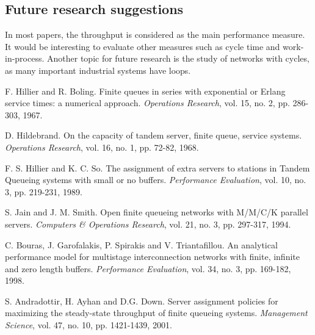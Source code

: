 \documentclass[twoside]{article}
\begin{document}
\begin{multicols}{2}
\subsection*{\textbf{Future research suggestions}}
In most papers, the throughput is considered as the main performance measure. It would be interesting to evaluate other measures such as cycle time and work-in-process. Another topic for future research is the study of networks with cycles, as many important industrial systems have loops.

\begin{thebibliography}{9}

  F. Hillier and R. Boling. Finite queues in series with exponential or Erlang service times: a numerical approach. \textit{Operations Research}, vol. 15, no. 2, pp. 286-303, 1967.

  D. Hildebrand. On the capacity of tandem server, finite queue, service systems. \textit{Operations Research}, vol. 16, no. 1, pp. 72-82, 1968.

  F. S. Hillier and K. C. So. The assignment of extra servers to stations in Tandem Queueing systems with small or no buffers. \textit{Performance Evaluation}, vol. 10, no. 3, pp. 219-231, 1989.

  S. Jain and J. M. Smith. Open finite queueing networks with M/M/C/K parallel servers. \textit{Computers \& Operations Research}, vol. 21, no. 3, pp. 297-317, 1994. 

  C. Bouras, J. Garofalakis, P. Spirakis and V. Triantafillou. An analytical performance model for multistage interconnection networks with finite, infinite and zero length buffers. \textit{Performance Evaluation}, vol. 34, no. 3, pp. 169-182, 1998.

  S. Andradottir, H. Ayhan and D.G. Down. Server assignment policies for maximizing the steady-state throughput of finite queueing systems. \textit{Management Science}, vol. 47, no. 10, pp. 1421-1439, 2001.


\end{thebibliography}
\end{multicols}
\end{document}
